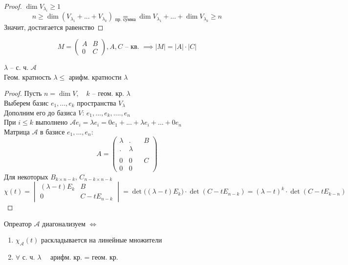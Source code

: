\begin{proof}
	$ \dim V_{\lambda_i} \ge 1 $
	$$ n \ge \dim(V_{\lambda_1} + ... + V_{\lambda_k}) \underset{\text{пр. сумма}}= \dim V_{\lambda_1} + ... + \dim V_{\lambda_k} \ge n $$
	Значит, достигается равенство
\end{proof}

\begin{remind}
	$$ M =
	\begin{pmatrix}
		A & B \\
		0 & C
	\end{pmatrix}, A, C \text{ -- кв. } \implies |M| = |A| \cdot |C| $$
\end{remind}

\begin{theorem}
	$ \lambda $ -- с. ч. $ \mathcal{A} $ \\
	Геом. кратность $ \lambda \le $ арифм. кратности $ \lambda $
\end{theorem}

\begin{proof}
	Пусть $ n = \dim V, \quad k $ -- геом. кр. $ \lambda $ \\
	Выберем базис $ e_1, ..., e_k $ пространства $ V_{\lambda} $ \\
	Дополним его до базиса $ V $: $ e_1, ..., e_k, ...., e_n $ \\
	При $ i \le k $ выполнено $ \mathcal{A} e_i = \lambda e_i = 0e_1 + ... + \lambda e_i + ... + 0e_n $ \\
	Матрица $ \mathcal{A} $ в базисе $ e_1, ..., e_n $:
	$$ A =
	\begin{pmatrix}
		\lambda & . & & B \\
		. & \lambda & & \\
		\\
		0 & 0 & & C \\
		0 & 0 & &
	\end{pmatrix} $$
	Для некоторых $ B_{k \times n - k} $, $ C_{n - k \times n - k} $
	$$ \chi(t) =
	\begin{vmatrix}
		(\lambda - t)E_k & B \\
		0 & C - tE_{n - k}
	\end{vmatrix} = \det \bigg( (\lambda - t)E_k \bigg) \cdot \det(C - tE_{n - k}) = (\lambda - t)^k \cdot \det(C - tE_{k - n}) $$
\end{proof}

\begin{implication}
	Опреатор $ \mathcal{A} $ диагонализуем $ \iff $
	\begin{enumerate}
		\item $ \chi_{\mathcal{A}}(t) $ раскладывается на линейные множители
		\item $ \forall $ с. ч. $ \lambda \quad $ арифм. кр. = геом. кр.
	\end{enumerate}
\end{implication}

